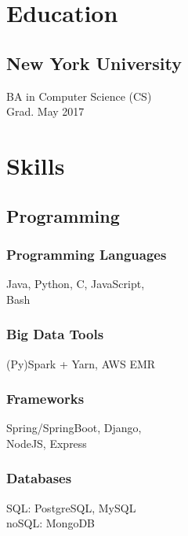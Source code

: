 \documentclass[]{two-column-resume}
\begin{document}
\begin{minipage}[t]{0.34\textwidth}

\section{Education} 

\subsection{New York University}
BA in Computer Science (CS) \\
Grad. May 2017 \\
\sectionsep


\section{Skills}
\setlength{\parindent}{3ex}
\subsection{Programming}
\subsubsection{Programming Languages}
Java, Python, C, JavaScript,\\
Bash
\newline

\subsubsection{Big Data Tools}
(Py)Spark + Yarn, AWS EMR
\newline

\subsubsection{Frameworks}
Spring/SpringBoot, Django,\\
NodeJS, Express
\newline

\subsubsection{Databases}
SQL: PostgreSQL, MySQL\\
noSQL: MongoDB
\newline


\end{minipage}
\end{document}

